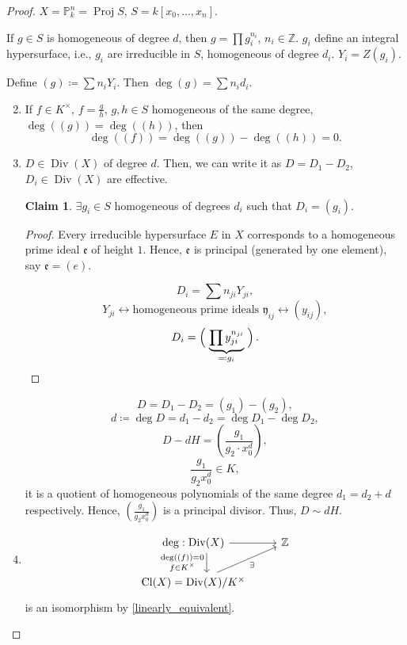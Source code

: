 \documentclass[12pt]{article}
\DeclareMathOperator{\Proj}{Proj}
\DeclareMathOperator{\Div}{Div}
\DeclareMathOperator{\Cl}{Cl}
\theoremstyle{definition}
\newtheorem*{claim}{Claim}
\theoremstyle{remark}
\begin{document}
\begin{proof}
$X=\mathbb{P}_k^n=\Proj S$, $S=k[x_0,\ldots,x_n]$.

If $g\in S$ is homogeneous of degree $d$, then $g=\prod g_i^{n_i}$, $n_i\in\mathbb{Z}$. $g_i$ define an integral hypersurface, i.e., $g_i$ are irreducible in $S$, homogeneous of degree $d_i$. $Y_i=Z(g_i)$. 

Define $(g)\coloneqq\sum n_iY_i$. Then $\deg(g)=\sum n_id_i$.

\begin{enumerate}[label=\arabic*)]
\setcounter{enumi}{1}
\item If $f\in K^{\times}$, $f=\frac{g}{h}$, $g,h\in S$ homogeneous of the same degree, $\deg((g))=\deg((h))$, then
\[\deg((f))=\deg((g))-\deg((h))=0.\]

\setcounter{enumi}{0}
\item $D\in\Div(X)$ of degree $d$. Then, we can write it as $D=D_1-D_2$, $D_i\in\Div(X)$ are effective.

\begin{claim}
$\exists g_i\in S$ homogeneous of degrees $d_i$ such that $D_i=(g_i)$.
\end{claim}

\begin{proof}
Every irreducible hypersurface $E$ in $X$ corresponds to a homogeneous prime ideal $\mathfrak{e}$ of height $1$. Hence, $\mathfrak{e}$ is principal (generated by one element), say $\mathfrak{e}=(e)$.

\[D_i=\sum n_{ji}Y_{ji},\]
\[Y_{ji}\longleftrightarrow\text{homogeneous prime ideals }\mathfrak{y}_{ij}\longleftrightarrow(y_{ij}),\]
\[D_i=\left(\vphantom{\prod y_{ji}^{n_{ji}}}\right.\underbrace{\prod y_{ji}^{n_{ji}}}_{\eqqcolon g_i}\left.\vphantom{\prod y_{ji}^{n_{ji}}}\right).\]
\end{proof}

\[D=D_1-D_2=(g_1)-(g_2),\]
\[d\coloneqq\deg D=d_1-d_2=\deg D_1-\deg D_2,\]
\[D-dH=\left(\frac{g_1}{g_2\cdot x_0^d}\right),\]
\[\frac{g_1}{g_2x_0^d}\in K,\]
it is a quotient of homogeneous polynomials of the same degree $d_1=d_2+d$ respectively. Hence, $(\frac{g_1}{g_2x_0^d})$ is a principal divisor. Thus, $D\sim dH$.

\setcounter{enumi}{2}
\item
\[
\begin{tikzcd}
\deg:\Div(X)\arrow[r]\arrow[d,shift left=5,"\substack{\deg((f))=0\\
f\in K^{\times}}",swap]&\mathbb{Z}\\
\Cl(X)=\Div(X)/K^{\times}\arrow[ru,"\exists",swap]
\end{tikzcd}
\]
is an isomorphism by \ref{linearly_equivalent}.
\end{enumerate}
\end{proof}
\end{document}
